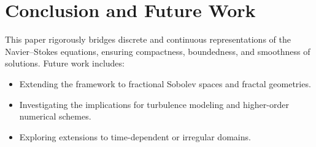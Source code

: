 \documentclass[12pt]{article}
\begin{document}
\section{Conclusion and Future Work}

This paper rigorously bridges discrete and continuous representations of the Navier--Stokes equations, ensuring compactness, boundedness, and smoothness of solutions. Future work includes:
\begin{itemize}
    \item Extending the framework to fractional Sobolev spaces and fractal geometries.
    \item Investigating the implications for turbulence modeling and higher-order numerical schemes.
    \item Exploring extensions to time-dependent or irregular domains.
\end{itemize}
\end{document}
